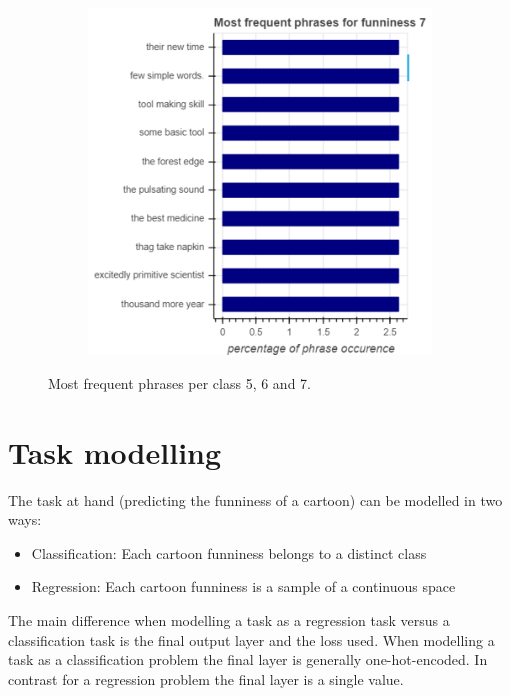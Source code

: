 \documentclass[draft,final,oneside]{vutinfth} %
\begin{document}
\begin{figure}
\begin{subfigure}[b]{0.45\textwidth}
\centering
\includegraphics[width=1.0\textwidth]{graphics/phrases/funniness_7}
\end{subfigure}

\caption{Most frequent phrases per class 5, 6 and 7.}
\label{fig:phraseocc2}

\end{figure}

\section{Task modelling}

The task at hand (predicting the funniness of a cartoon) can be modelled in two ways: 
\begin{itemize}
\item Classification: Each cartoon funniness belongs to a distinct class
\item Regression: Each cartoon funniness is a sample of a continuous space
\end{itemize}

The main difference when modelling a task as a regression task versus a classification task is the final output layer and the loss used. When modelling a task as a classification problem the final layer is generally one-hot-encoded. In contrast for a regression problem the final layer is a single value. \\
\end{document}
